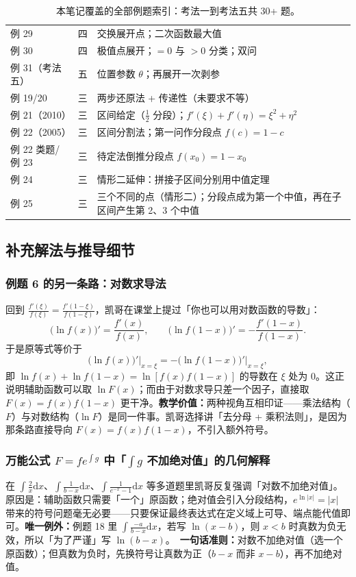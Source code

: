 \documentclass[a4paper]{article}
\begin{document}
\begin{table}[H]
\begin{tabular}{lll}
例 29 & 四 & 交换展开点；二次函数最大值 \\
例 30 & 四 & 极值点展开；$=0$ 与 $>0$ 分类；双问 \\
例 31（考法五） & 五 & 位置参数 $\theta$；再展开一次剥参 \\
例 19/20 & 三 & 两步还原法 + 传递性（未要求不等） \\
例 21（2010） & 三 & 区间给定（$\frac12$ 分段）；$f'(\xi)+f'(\eta)=\xi^2+\eta^2$ \\
例 22（2005） & 三 & 区间分割法；第一问作分段点 $f(c)=1-c$ \\
例 22 类题/例 23 & 三 & 待定法倒推分段点 $f(x_0)=1-x_0$ \\
例 24 & 三 & 情形二延伸：拼接子区间分别用中值定理 \\
例 25 & 三 & 三个不同的点（情形二）；分段点成为第一个中值，再在子区间产生第 2、3 个中值 \\
\bottomrule
\end{tabular}
\caption{本笔记覆盖的全部例题索引：考法一到考法五共 30+ 题。}
\end{table}


\subsection{补充解法与推导细节}

\subsubsection{例题 6 的另一条路：对数求导法}

回到 $\frac{f'(\xi)}{f(\xi)}=\frac{f'(1-\xi)}{f(1-\xi)}$，凯哥在课堂上提过「你也可以用对数函数的导数」：
\[
\Big(\ln f(x)\Big)'=\frac{f'(x)}{f(x)},\qquad \Big(\ln f(1-x)\Big)'=-\frac{f'(1-x)}{f(1-x)}.
\]
于是原等式等价于
\[
\Big(\ln f(x)\Big)'\Big|_{x=\xi}=-\Big(\ln f(1-x)\Big)'\Big|_{x=\xi},
\]
即 $\ln f(x)+\ln f(1-x)=\ln[f(x)f(1-x)]$ 的导数在 $\xi$ 处为 0。这正说明辅助函数可以取 $\ln F(x)$；而由于对数求导只差一个因子，直接取 $F(x)=f(x)f(1-x)$ 更干净。\textbf{教学价值：}两种视角互相印证——乘法结构（$F$）与对数结构（$\ln F$）是同一件事。凯哥选择讲「去分母 + 乘积法则」，是因为那条路直接导向 $F(x)=f(x)f(1-x)$，不引入额外符号。

\subsubsection{万能公式 $F=fe^{\int g}$ 中「$\int g$ 不加绝对值」的几何解释}

在 $\int\frac{2}{x}\mathrm{d}x$、$\int\frac{1}{b-x}\mathrm{d}x$、$\int\frac{1}{e^{-x}-1}\mathrm{d}x$ 等多道题里凯哥反复强调「对数不加绝对值」。原因是：辅助函数只需要「一个」原函数；绝对值会引入分段结构，$e^{\ln|x|}=|x|$ 带来的符号问题毫无必要——只要保证最终表达式在定义域上可导、端点能代值即可。\textbf{唯一例外：}例题 18 里 $\int\frac{-a}{b-x}\mathrm{d}x$，若写 $\ln(x-b)$，则 $x<b$ 时真数为负无效，所以「为了严谨」写 $\ln(b-x)$。\
\textbf{一句话准则：}对数不加绝对值（选一个原函数）；但真数为负时，先换符号让真数为正（$b-x$ 而非 $x-b$），再不加绝对值。
\end{document}
